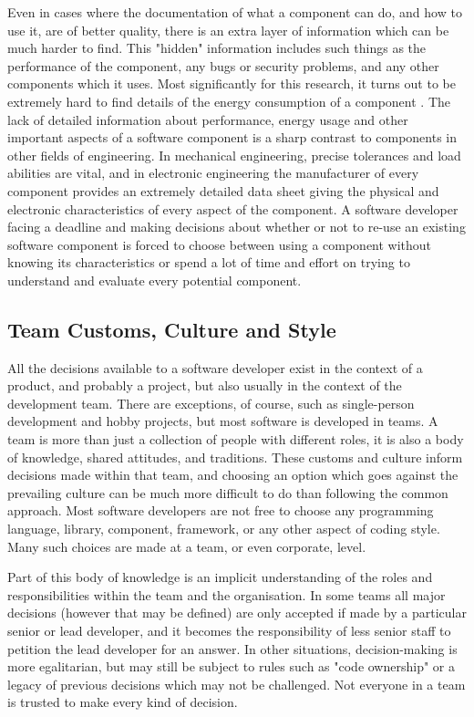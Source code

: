 Even in cases where the documentation of what a component can do, and how to use it, are of better quality, there is an extra layer of information which can be much harder to find. This "hidden" information includes such things as the performance of the component, any bugs or security problems, and any other components which it uses. Most significantly for this research, it turns out to be extremely hard to find details of the energy consumption of a component . The lack of detailed information about performance, energy usage and other important aspects of a software component is a sharp contrast to components in other fields of engineering. In mechanical engineering, precise tolerances and load abilities are vital, and in electronic engineering the manufacturer of every component provides an extremely detailed data sheet giving the physical and electronic characteristics of every aspect of the component.  A software developer facing a deadline and making decisions about whether or not to re-use an existing software component is forced to choose between using a component without knowing its characteristics or spend a lot of time and effort on trying to understand and evaluate every potential component.

\subsection{Team Customs, Culture and Style}

All the decisions available to a software developer exist in the context of a product, and probably a project, but also usually in the context of the development team. There are exceptions, of course, such as single-person development and hobby projects, but most software is developed in teams. A team is more than just a collection of people with different roles, it is also a body of knowledge, shared attitudes, and traditions. These customs and culture inform decisions made within that team, and choosing an option which goes against the prevailing culture can be much more difficult to do than following the common approach. Most software developers are not free to choose any programming language, library, component, framework, or any other aspect of coding style. Many such choices are made at a team, or even corporate, level.

Part of this body of knowledge is an implicit understanding of the roles and responsibilities within the team and the organisation. In some teams all major decisions (however that may be defined) are only accepted if made by a particular senior or lead developer, and it becomes the responsibility of less senior staff to petition the lead developer for an answer. In other situations, decision-making is more egalitarian, but may still be subject to rules such as "code ownership"  or a legacy of previous decisions which may not be challenged. Not everyone in a team is trusted to make every kind of decision.

